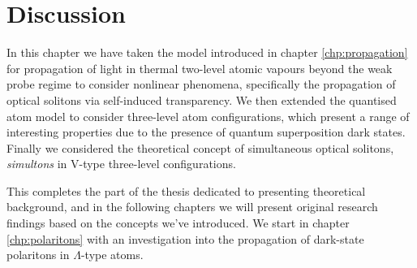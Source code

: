 \section{Discussion}
  \label{sec:nonlinear_discussion}

    In this chapter we have taken the model introduced in chapter
    \ref{chp:propagation} for propagation of light in thermal two-level atomic
    vapours beyond the weak probe regime to consider nonlinear phenomena,
    specifically the propagation of optical solitons via self-induced
    transparency. We then extended the quantised atom model to consider 
    three-level atom configurations, which present a range of interesting 
    properties
    due to the presence of quantum superposition dark states. Finally we
    considered the theoretical concept of simultaneous optical solitons,
    \textit{simultons} in V-type three-level configurations.

    This completes the part of the thesis dedicated to presenting theoretical
    background, and in the following chapters we will present original research
    findings based on the concepts we've introduced. We start in chapter
    \ref{chp:polaritons} with an investigation into the propagation of 
    dark-state polaritons in $\Lambda$-type atoms.
